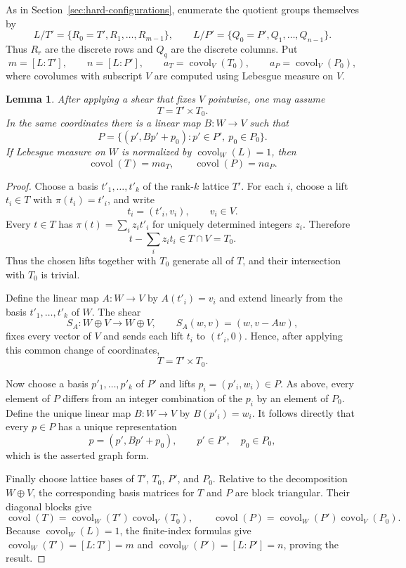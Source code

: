 \documentclass[11pt,reqno]{amsart}
\numberwithin{equation}{section}
\newtheorem{lemma}[theorem]{Lemma}
\theoremstyle{definition}
\theoremstyle{remark}
\newcommand{\covol}{\operatorname{covol}}
\begin{document}
As in Section~\ref{sec:hard-configurations}, enumerate the quotient groups themselves by
\begin{equation}\label{eq:nondiscrete-rows-columns}
 L/T'=\{R_0=T',R_1,\ldots,R_{m-1}\},
 \qquad
 L/P'=\{Q_0=P',Q_1,\ldots,Q_{n-1}\}.
\end{equation}
Thus $R_r$ are the discrete rows and $Q_q$ are the discrete columns.  Put
\[
 m=[L:T'],
 \qquad
 n=[L:P'],
 \qquad
 a_T=\covol_V(T_0),
 \qquad
 a_P=\covol_V(P_0),
\]
where covolumes with subscript $V$ are computed using Lebesgue measure on
$V$.

\begin{lemma}\label{lem:product-graph-normal}
After applying a shear that fixes $V$ pointwise, one may assume
\[
 T=T'\times T_0.
\]
In the same coordinates there is a linear map $B:W\to V$ such that
\[
 P=\{(p',Bp'+p_0):p'\in P',\ p_0\in P_0\}.
\]
If Lebesgue measure on $W$ is normalized by $\covol_W(L)=1$, then
\[
 \covol(T)=m a_T,
 \qquad
 \covol(P)=n a_P.
\]
\end{lemma}

\begin{proof}
Choose a basis $t'_1,\ldots,t'_k$ of the rank-$k$ lattice $T'$.  For each
$i$, choose a lift $t_i\in T$ with $\pi(t_i)=t'_i$, and write
\[
 t_i=(t'_i,v_i),
 \qquad v_i\in V.
\]
Every $t\in T$ has $\pi(t)=\sum_i z_i t'_i$ for uniquely determined
integers $z_i$.  Therefore
\[
 t-\sum_i z_i t_i\in T\cap V=T_0.
\]
Thus the chosen lifts together with $T_0$ generate all of $T$, and their
intersection with $T_0$ is trivial.

Define the linear map $A:W\to V$ by $A(t'_i)=v_i$ and extend linearly from
the basis $t'_1,\ldots,t'_k$ of $W$.  The shear
\[
 S_A:W\oplus V\longrightarrow W\oplus V,
 \qquad
 S_A(w,v)=(w,v-Aw),
\]
fixes every vector of $V$ and sends each lift $t_i$ to $(t'_i,0)$.  Hence,
after applying this common change of coordinates,
\[
 T=T'\times T_0.
\]

Now choose a basis $p'_1,\ldots,p'_k$ of $P'$ and lifts
$p_i=(p'_i,w_i)\in P$.  As above, every element of $P$ differs from an
integer combination of the $p_i$ by an element of $P_0$.  Define the unique
linear map $B:W\to V$ by $B(p'_i)=w_i$.  It follows directly that every
$p\in P$ has a unique representation
\[
 p=(p',Bp'+p_0),
 \qquad p'\in P',\quad p_0\in P_0,
\]
which is the asserted graph form.

Finally choose lattice bases of $T'$, $T_0$, $P'$, and $P_0$.  Relative to
the decomposition $W\oplus V$, the corresponding basis matrices for $T$
and $P$ are block triangular.  Their diagonal blocks give
\[
 \covol(T)=\covol_W(T')\covol_V(T_0),
 \qquad
 \covol(P)=\covol_W(P')\covol_V(P_0).
\]
Because $\covol_W(L)=1$, the finite-index formulas give
$\covol_W(T')=[L:T']=m$ and $\covol_W(P')=[L:P']=n$, proving the result.
\end{proof}
\end{document}
